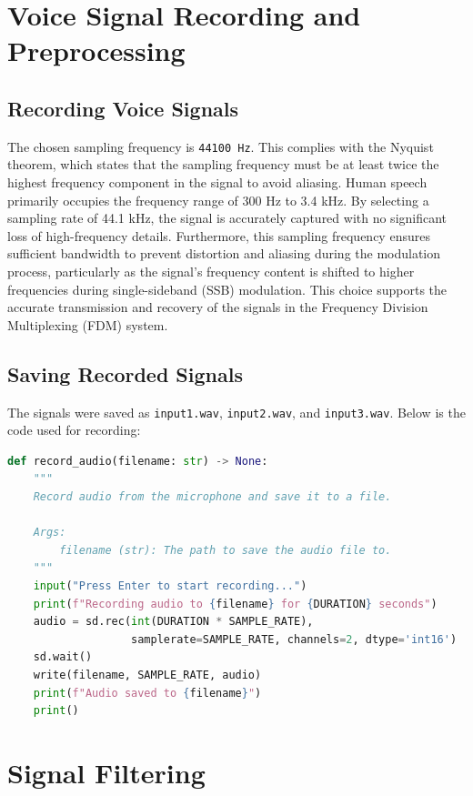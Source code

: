 \documentclass[12pt,a4paper]{article}
\begin{document}
\newpage

\section{Voice Signal Recording and Preprocessing}

\subsection{Recording Voice Signals}
The chosen sampling frequency is \texttt{44100 Hz}. This complies with the Nyquist theorem, which states that the sampling frequency must be at least twice the highest frequency component in the signal to avoid aliasing. Human speech primarily occupies the frequency range of 300 Hz to 3.4 kHz. By selecting a sampling rate of 44.1 kHz, the signal is accurately captured with no significant loss of high-frequency details. Furthermore, this sampling frequency ensures sufficient bandwidth to prevent distortion and aliasing during the modulation process, particularly as the signal's frequency content is shifted to higher frequencies during single-sideband (SSB) modulation. This choice supports the accurate transmission and recovery of the signals in the Frequency Division Multiplexing (FDM) system.

\subsection{Saving Recorded Signals}
The signals were saved as \texttt{input1.wav}, \texttt{input2.wav}, and \texttt{input3.wav}. Below is the code used for recording:
\begin{lstlisting}[language=Python, caption=Voice Recording Code]
def record_audio(filename: str) -> None:
    """
    Record audio from the microphone and save it to a file.

    Args:
        filename (str): The path to save the audio file to.
    """
    input("Press Enter to start recording...")
    print(f"Recording audio to {filename} for {DURATION} seconds")
    audio = sd.rec(int(DURATION * SAMPLE_RATE),
                   samplerate=SAMPLE_RATE, channels=2, dtype='int16')
    sd.wait()
    write(filename, SAMPLE_RATE, audio)
    print(f"Audio saved to {filename}")
    print()
\end{lstlisting}

\newpage

\section{Signal Filtering}
\end{document}
